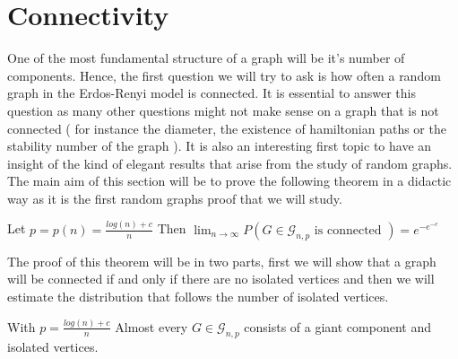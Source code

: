 \section{Connectivity}

One of the most fundamental structure of a graph will be it's number of components. Hence, the first question we will try to ask is how often a random graph in the Erdos-Renyi model is connected. It is essential to answer this question as many other questions might not make sense on a graph that is not connected ( for instance the diameter, the existence of hamiltonian paths or the stability number of the graph ). 
\newline
It is also an interesting first topic to have an insight of the kind of elegant results that arise from the study of random graphs. The main aim of this section will be to prove the following theorem in a didactic way as it is the first random graphs proof that we will study.
\begin{theorem}\label{th:connect}
Let $p = p(n) = \frac{log(n) + c}{n}$
\newline
Then $\lim_{n \to \infty} P(G \in \mathcal{G}_{n, p}\text{ is connected }) = e^{-e^{-c}}$ 
\end{theorem}
The proof of this theorem will be in two parts, first we will show that a graph will be connected if and only if there are no isolated vertices and then we will estimate the distribution that follows the number of isolated vertices.
\begin{theorem}\label{th:isolcomp}
	With $p = \frac{log(n) + c}{n}$
	 Almost every $G \in \mathcal{G}_{n, p}$ consists of a giant component and isolated vertices. 
\end{theorem}
